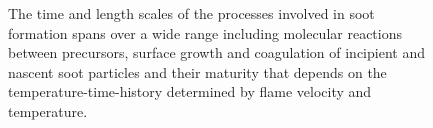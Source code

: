 \begin{figure}[H]
	\centering
	\caption{The time and length scales of the processes involved in soot formation spans over a wide range including molecular reactions between precursors, surface growth and coagulation of incipient and nascent soot particles and their maturity that depends on the temperature-time-history determined by flame velocity and temperature.}
	\label{fig:sootscales}
\end{figure}



